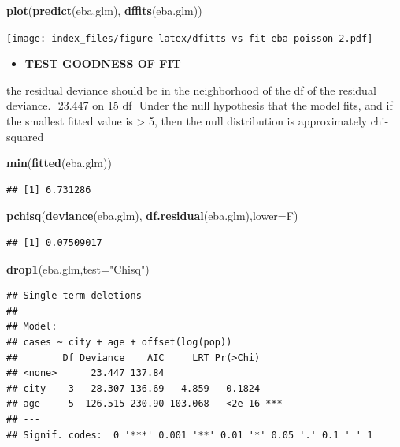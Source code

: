 \documentclass[
]{article}
\newenvironment{Shaded}{\begin{snugshade}}{\end{snugshade}}
\newcommand{\DataTypeTok}[1]{\textcolor[rgb]{0.13,0.29,0.53}{#1}}
\newcommand{\KeywordTok}[1]{\textcolor[rgb]{0.13,0.29,0.53}{\textbf{#1}}}
\newcommand{\NormalTok}[1]{#1}
\newcommand{\StringTok}[1]{\textcolor[rgb]{0.31,0.60,0.02}{#1}}
\providecommand{\tightlist}{%
  \setlength{\itemsep}{0pt}\setlength{\parskip}{0pt}}
\begin{document}
\begin{Shaded}
\begin{Highlighting}[]
\KeywordTok{plot}\NormalTok{(}\KeywordTok{predict}\NormalTok{(eba.glm), }\KeywordTok{dffits}\NormalTok{(eba.glm))}
\end{Highlighting}
\end{Shaded}

\texttt{[image: index\_files/figure-latex/dfitts vs fit eba poisson-2.pdf]}

\begin{itemize}
\tightlist
\item
  \textbf{TEST GOODNESS OF FIT}
\end{itemize}

the residual deviance should be in the neighborhood of the df of the
residual deviance. ︎ 23.447 on 15 df ︎ Under the null hypothesis that
the model fits, and if the smallest fitted value is \textgreater{} 5,
then the null distribution is approximately chi‐squared

\begin{Shaded}
\begin{Highlighting}[]
\KeywordTok{min}\NormalTok{(}\KeywordTok{fitted}\NormalTok{(eba.glm))}
\end{Highlighting}
\end{Shaded}

\begin{verbatim}
## [1] 6.731286
\end{verbatim}

\begin{Shaded}
\begin{Highlighting}[]
\KeywordTok{pchisq}\NormalTok{(}\KeywordTok{deviance}\NormalTok{(eba.glm),}
\KeywordTok{df.residual}\NormalTok{(eba.glm),}\DataTypeTok{lower=}\NormalTok{F) }
\end{Highlighting}
\end{Shaded}

\begin{verbatim}
## [1] 0.07509017
\end{verbatim}

\begin{Shaded}
\begin{Highlighting}[]
\KeywordTok{drop1}\NormalTok{(eba.glm,}\DataTypeTok{test=}\StringTok{"Chisq"}\NormalTok{)}
\end{Highlighting}
\end{Shaded}

\begin{verbatim}
## Single term deletions
## 
## Model:
## cases ~ city + age + offset(log(pop))
##        Df Deviance    AIC     LRT Pr(>Chi)    
## <none>      23.447 137.84                     
## city    3   28.307 136.69   4.859   0.1824    
## age     5  126.515 230.90 103.068   <2e-16 ***
## ---
## Signif. codes:  0 '***' 0.001 '**' 0.01 '*' 0.05 '.' 0.1 ' ' 1
\end{verbatim}
\end{document}
